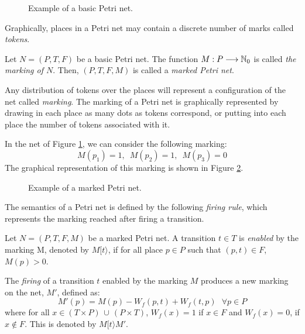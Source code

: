 \begin{figure}

\caption{\label{fig201} Example of a basic Petri net.}
\end{figure}

Graphically, places in a Petri net may contain a discrete number of marks called \emph{tokens}. 

\begin{definition} 
Let $N=(P,T,F)$ be a basic Petri net.
The function $M: P \longrightarrow
\mathbb{N}_{0}$ is called {\it the marking of $N$}. Then,
$(P,T,F,M)$ is called a {\it marked Petri net}.
\end{definition}

Any distribution of tokens over the places will represent a configuration of the net called \emph{marking}.
The marking of a Petri net is graphically represented by drawing
in each place as many dots as tokens correspond,
or putting into each place the number of tokens associated with it. 


\begin{example} In the net of Figure \ref{fig201}, we can consider the following marking:
\[ M(p_1) = 1,\,\,\,M(p_2)=1,\,\,\,M(p_3)=0 \]
The graphical representation of this marking is shown in Figure \ref{fig202}.
\end{example}

\begin{figure}

\caption{\label{fig202} Example of a marked Petri net.}
\end{figure}

The semantics of a Petri net is defined by the following \emph{firing rule}, which
represents the marking reached after firing a transition.

\begin{definition}
Let $N=(P,T,F,M)$ be a marked Petri net. A transition $t \in T$
is {\it enabled} by the marking M, denoted by $M[t\rangle$, if for all place
$p \in P$ such that $(p,t) \in F$, $M(p) > 0$.
\end{definition}

\begin{definition}
The \emph{firing} of a transition $t$ enabled by the marking $M$
produces a new marking on the net, $M'$, defined as:
\[M'(p) = M(p) - W_f(p,t) + W_f(t,p)~~~\forall p \in P\]
where for all $x \in (T \times P) \, \cup \, (P \times T)$,  
$W_f(x) = 1$ if $x \in F$ and $W_f(x) = 0$, if $x \not\in F$.
This is denoted by $M[t\rangle M'$.
\end{definition}

